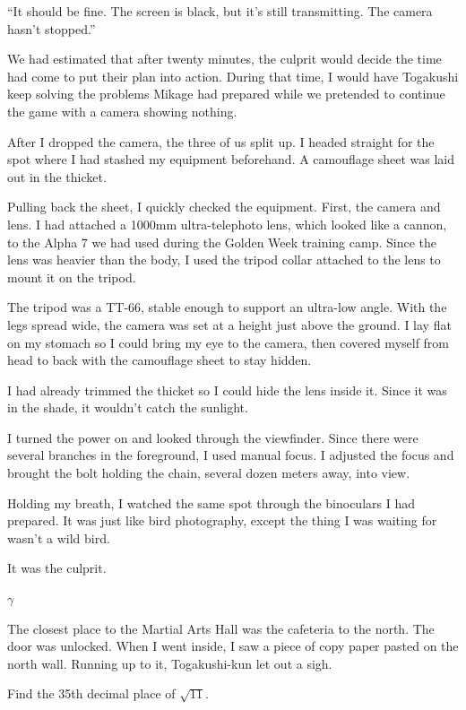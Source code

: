 \documentclass[
    a4paper,
    12pt,
    twoside,
    openany,
    UTF8,
    fontset=windows
]{ctexbook}
\begin{document}
``It should be fine. The screen is black, but it's still transmitting. The camera hasn't stopped.''

We had estimated that after twenty minutes, the culprit would decide the time had come to put their plan into action. During that time, I would have Togakushi keep solving the problems Mikage had prepared while we pretended to continue the game with a camera showing nothing.

After I dropped the camera, the three of us split up. I headed straight for the spot where I had stashed my equipment beforehand. A camouflage sheet was laid out in the thicket.

Pulling back the sheet, I quickly checked the equipment. First, the camera and lens. I had attached a 1000mm ultra-telephoto lens, which looked like a cannon, to the Alpha 7 we had used during the Golden Week training camp. Since the lens was heavier than the body, I used the tripod collar attached to the lens to mount it on the tripod.

The tripod was a TT-66, stable enough to support an ultra-low angle. With the legs spread wide, the camera was set at a height just above the ground. I lay flat on my stomach so I could bring my eye to the camera, then covered myself from head to back with the camouflage sheet to stay hidden.

I had already trimmed the thicket so I could hide the lens inside it. Since it was in the shade, it wouldn't catch the sunlight.

I turned the power on and looked through the viewfinder. Since there were several branches in the foreground, I used manual focus. I adjusted the focus and brought the bolt holding the chain, several dozen meters away, into view.

Holding my breath, I watched the same spot through the binoculars I had prepared. It was just like bird photography, except the thing I was waiting for wasn't a wild bird.

It was the culprit.

$\gamma$

The closest place to the Martial Arts Hall was the cafeteria to the north. The door was unlocked. When I went inside, I saw a piece of copy paper pasted on the north wall. Running up to it, Togakushi-kun let out a sigh.

\begin{center}
Find the 35th decimal place of $\sqrt{11}$.
\end{center}
\end{document}
